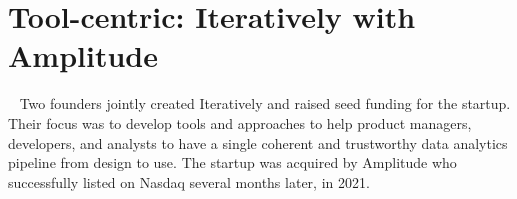 \clearpage


\section{Tool-centric: Iteratively with Amplitude}~\label{case-study-overview-iteratively-with-amplitude}
Two founders jointly created Iteratively and raised seed funding for the startup. Their focus was to develop tools and approaches to help product managers, developers, and analysts to have a single coherent and trustworthy data analytics pipeline from design to use. The startup was acquired by Amplitude who successfully listed on Nasdaq several months later, in 2021. 

